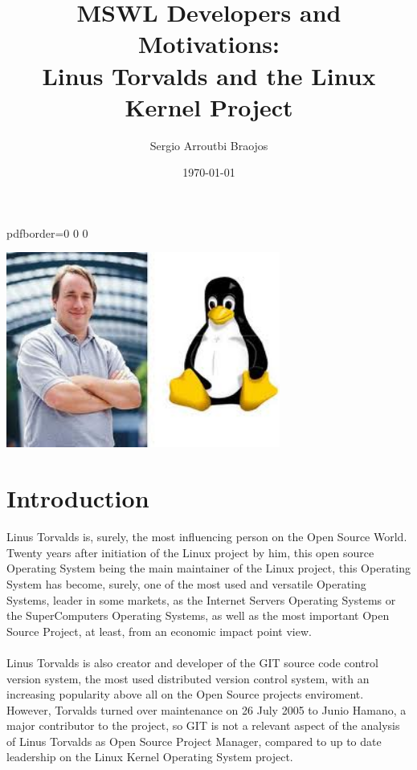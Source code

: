 \documentclass[11pt]{article}
\title{\textbf{MSWL Developers and Motivations:\\
Linus Torvalds and the Linux Kernel Project}}
\author{Sergio Arroutbi Braojos}
\date{\today}
\begin{document}
\hypersetup
{   
pdfborder={0 0 0}
}
   
\maketitle

\begin{center}
\includegraphics[width=90mm]{LinusLinux.jpeg}
\end{center}

\pagebreak

\tableofcontents
\listoffigures
\listoftables

\pagebreak

\section{Introduction}
Linus Torvalds is, surely, the most influencing person on the Open Source World. Twenty years after initiation of the Linux project by him, this open source Operating System being the main maintainer of the Linux project, this Operating System has become, surely, one of the most used and versatile Operating Systems, leader in some markets, as the Internet Servers Operating Systems or the SuperComputers Operating Systems, as well as the most important Open Source Project, at least, from an economic impact point view.\\
\\
Linus Torvalds is also creator and developer of the GIT source code control version system, the most used distributed version control system, with an increasing popularity above all on the Open Source projects enviroment. However, Torvalds turned over maintenance on 26 July 2005 to Junio Hamano, a major contributor to the project, so GIT is not a relevant aspect of the analysis of Linus Torvalds as Open Source Project Manager, compared to up to date leadership on the Linux Kernel Operating System project.
\end{document}
